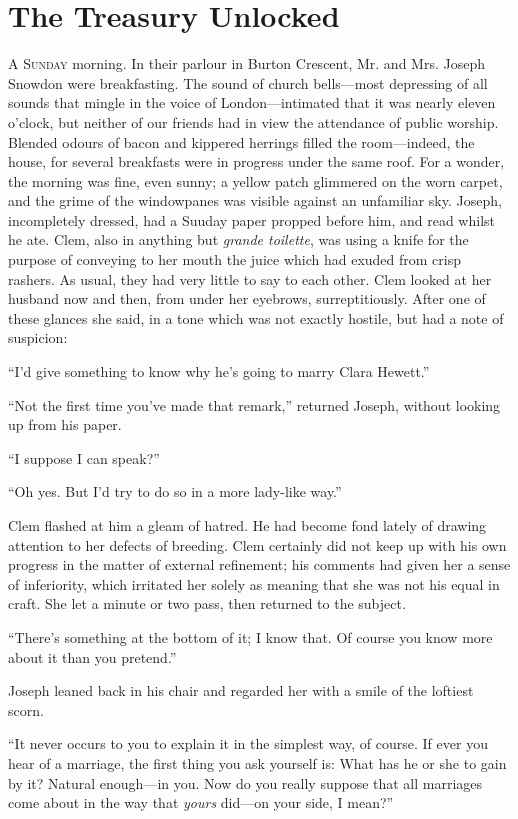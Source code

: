 \chapter{The Treasury Unlocked}

\textsc{A Sunday} morning. In their parlour in Burton Crescent, Mr. and
Mrs. Joseph Snowdon were breakfasting. The sound of church bells---most
depressing of all sounds that mingle in the voice of London---intimated
that it was nearly eleven o'clock, but neither of our friends had in
view the attendance of public worship. Blended odours of bacon and
kippered herrings filled the room---indeed, the house, for several
breakfasts were in progress under the same roof. For a wonder, the
morning was fine, even sunny; a yellow patch glimmered on the worn
carpet, and the grime of the windowpanes was visible against an
unfamiliar sky. Joseph, incompletely dressed, had a Suuday paper propped
before him, and read whilst he ate. Clem, also in anything but
\emph{grande toilette}, was using a knife for the purpose of
{\protect\hypertarget{157}{}{}}conveying to her mouth the juice which
had exuded from crisp rashers. As usual, they had very little to say to
each other. Clem looked at her husband now and then, from under her
eyebrows, surreptitiously. After one of these glances she said, in a
tone which was not exactly hostile, but had a note of suspicion:

``I'd give something to know why he's going to marry Clara Hewett.''

``Not the first time you've made that remark,'' returned Joseph, without
looking up from his paper.

``I suppose I can speak?''

``Oh yes. But I'd try to do so in a more lady-like way.''

Clem flashed at him a gleam of hatred. He had become fond lately of
drawing attention to her defects of breeding. Clem certainly did not
keep up with his own progress in the matter of external refinement; his
comments had given her a sense of inferiority, which irritated her
solely as meaning that she was not his equal in craft. She let a minute
or two pass, then returned to the subject.

``There's something at the bottom of it; I
{\protect\hypertarget{158}{}{}}know that. Of course you know more about
it than you pretend.''

Joseph leaned back in his chair and regarded her with a smile of the
loftiest scorn.

``It never occurs to you to explain it in the simplest way, of course.
If ever you hear of a marriage, the first thing you ask yourself is:
What has he or she to gain by it? Natural enough---in you. Now do you
really suppose that all marriages come about in the way that
\emph{yours} did---on your side, I mean?''

